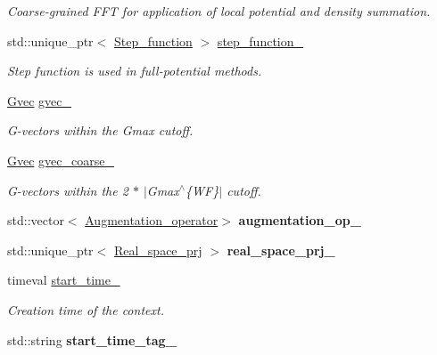 \begin{DoxyCompactItemize}
\begin{DoxyCompactList}\small\item\em Coarse-\/grained F\+F\+T for application of local potential and density summation. \end{DoxyCompactList}\item 
std\+::unique\+\_\+ptr$<$ \hyperlink{classsirius_1_1_step__function}{Step\+\_\+function} $>$ \hyperlink{classsirius_1_1_simulation__context_a0a1057d06e126cf048247071de680c4f}{step\+\_\+function\+\_\+}
\begin{DoxyCompactList}\small\item\em Step function is used in full-\/potential methods. \end{DoxyCompactList}\item 
\hyperlink{classsddk_1_1_gvec}{Gvec} \hyperlink{classsirius_1_1_simulation__context_aa6a79b4d6a9b7db89180187f8fb2243f}{gvec\+\_\+}
\begin{DoxyCompactList}\small\item\em G-\/vectors within the Gmax cutoff. \end{DoxyCompactList}\item 
\hyperlink{classsddk_1_1_gvec}{Gvec} \hyperlink{classsirius_1_1_simulation__context_a0aac68674184d2aefc6abdf0b2ff46a8}{gvec\+\_\+coarse\+\_\+}
\begin{DoxyCompactList}\small\item\em G-\/vectors within the 2 $\ast$ $\vert$\+Gmax$^\wedge$\{W\+F\}$\vert$ cutoff. \end{DoxyCompactList}\item 
\hypertarget{classsirius_1_1_simulation__context_a22603ae9f8d43cf8c08e95a143599251}{}std\+::vector$<$ \hyperlink{classsirius_1_1_augmentation__operator}{Augmentation\+\_\+operator}$>$ {\bfseries augmentation\+\_\+op\+\_\+}\label{classsirius_1_1_simulation__context_a22603ae9f8d43cf8c08e95a143599251}

\item 
\hypertarget{classsirius_1_1_simulation__context_a6298cd7e4b61c87ecee26047fd5ee4d4}{}std\+::unique\+\_\+ptr$<$ \hyperlink{classsirius_1_1_real__space__prj}{Real\+\_\+space\+\_\+prj} $>$ {\bfseries real\+\_\+space\+\_\+prj\+\_\+}\label{classsirius_1_1_simulation__context_a6298cd7e4b61c87ecee26047fd5ee4d4}

\item 
timeval \hyperlink{classsirius_1_1_simulation__context_a1f1edc57f044cacf58dd0c2ece553b51}{start\+\_\+time\+\_\+}
\begin{DoxyCompactList}\small\item\em Creation time of the context. \end{DoxyCompactList}\item 
\hypertarget{classsirius_1_1_simulation__context_a1fce6bd9e1b9caf20ab969871d4da83b}{}std\+::string {\bfseries start\+\_\+time\+\_\+tag\+\_\+}\label{classsirius_1_1_simulation__context_a1fce6bd9e1b9caf20ab969871d4da83b}


\end{DoxyCompactItemize}
